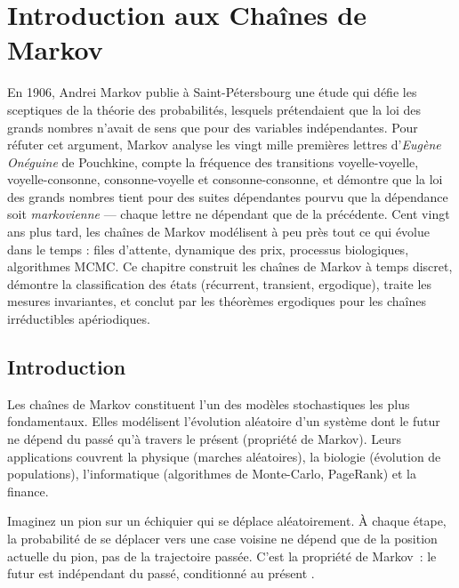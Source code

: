 \chapter{Introduction aux Cha\^ines de Markov}
\label{ch:markov}

En 1906, Andrei Markov publie à Saint-Pétersbourg une étude qui défie les sceptiques de la théorie des probabilités, lesquels prétendaient que la loi des grands nombres n'avait de sens que pour des variables indépendantes. Pour réfuter cet argument, Markov analyse les vingt mille premières lettres d'\emph{Eugène Onéguine} de Pouchkine, compte la fréquence des transitions voyelle-voyelle, voyelle-consonne, consonne-voyelle et consonne-consonne, et démontre que la loi des grands nombres tient pour des suites dépendantes pourvu que la dépendance soit \emph{markovienne} --- chaque lettre ne dépendant que de la précédente. Cent vingt ans plus tard, les chaînes de Markov modélisent à peu près tout ce qui évolue dans le temps : files d'attente, dynamique des prix, processus biologiques, algorithmes MCMC. Ce chapitre construit les chaînes de Markov à temps discret, démontre la classification des états (récurrent, transient, ergodique), traite les mesures invariantes, et conclut par les théorèmes ergodiques pour les chaînes irréductibles apériodiques.

\section{Introduction}

Les cha\^ines de Markov constituent l'un des mod\`eles
stochastiques les plus fondamentaux. Elles mod\'elisent l'\'evolution al\'eatoire d'un
syst\`eme dont le futur ne d\'epend du pass\'e qu'\`a travers le pr\'esent (propri\'et\'e
de Markov). Leurs applications couvrent la physique (marches al\'eatoires), la biologie
(\'evolution de populations), l'informatique (algorithmes de Monte-Carlo, PageRank) et
la finance.

\begin{intuition}[title=\textbf{La propri\'et\'e de Markov~: absence de m\'emoire}]
Imaginez un pion sur un \'echiquier qui se d\'eplace al\'eatoirement. \`A chaque \'etape,
la probabilit\'e de se d\'eplacer vers une case voisine ne d\'epend que de la position
actuelle du pion, pas de la trajectoire pass\'ee. C'est la propri\'et\'e de Markov~:
\og le futur est ind\'ependant du pass\'e, conditionn\'e au pr\'esent \fg.
\end{intuition}

